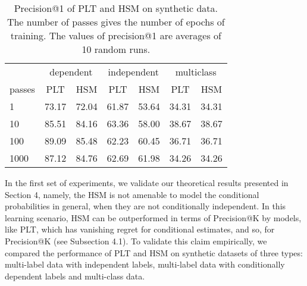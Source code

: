 \documentclass{article}
\newcommand{\Algo}[1]{\textsc{#1}}
\renewcommand{\vec}[1]{\boldsymbol{#1}}
\newcommand{\bx}{\vec{x}}
\newcommand{\bw}{\vec{w}}
\begin{document}
\begin{table}[]
	\centering
	\caption{Precision@1 of PLT and HSM on synthetic data. The number of passes gives the number of epochs of training. The values of precision@1 are averages of 10 random runs.}
	\label{tab:synthetic1}
\begin{tabular}{l|rr|rr|rr}
	\toprule
	 & \multicolumn{2}{c|}{dependent}                     & \multicolumn{2}{c|}{independent}                   & \multicolumn{2}{c}{multiclass}                    \\
	 passes & \multicolumn{1}{c}{PLT} & \multicolumn{1}{c|}{HSM} & \multicolumn{1}{c}{PLT} & \multicolumn{1}{c|}{HSM} & \multicolumn{1}{c}{PLT} & \multicolumn{1}{c}{HSM} \\
	\midrule
	1      & 73.17 & 72.04 & 61.87    & 53.64 & 34.31  & 34.31  \\
	10     & 85.51 & 84.16 & 63.36    & 58.00 & 38.67  & 38.67  \\
	100    & 89.09 & 85.48 & 62.23    & 60.45 & 36.71  & 36.71  \\
	1000   & 87.12 & 84.76 & 62.69    & 61.98 & 34.26  & 34.26 \\
	\bottomrule
\end{tabular}
\vspace{-0.4cm}
\end{table}


In the first set of experiments, we validate our theoretical results presented in Section 4, namely, the \Algo{HSM} is not amenable to model the conditional probabilities in general, when they are not conditionally independent. In this learning scenario, \Algo{HSM} can be outperformed in terms of Precision@K by models, like \Algo{PLT}, which has vanishing regret for conditional estimates, and so, for Precision@K (see Subsection 4.1). To validate this claim empirically, we compared the performance of \Algo{PLT} and \Algo{HSM} on synthetic datasets of three types: multi-label data with independent labels, multi-label data with conditionally dependent labels and multi-class data. 

\end{document}
